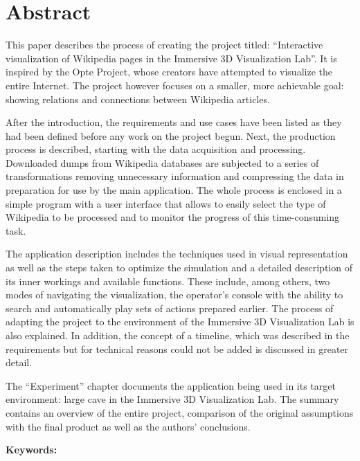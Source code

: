 \chapter*{Abstract}
This paper describes the process of creating the project titled: ``Interactive visualization of Wikipedia pages in the Immersive 3D Visualization Lab''. It is inspired by the Opte Project, whose creators have attempted to visualize the entire Internet. The project however focuses on a smaller, more achievable goal: showing relations and connections between Wikipedia articles.

After the introduction, the requirements and use cases have been listed as they had been defined before any work on the project begun. Next, the production process is described, starting with the data acquisition and processing. Downloaded dumps from Wikipedia databases are subjected to a series of transformations removing unnecessary information and compressing the data in preparation for use by the main application. The whole process is enclosed in a simple program with a user interface that allows to easily select the type of Wikipedia to be processed and to monitor the progress of this time-consuming task.

The application description includes the techniques used in visual representation as well as the steps taken to optimize the simulation and a detailed description of its inner workings and available functions. These include, among others, two modes of navigating the visualization, the operator's console with the ability to search and automatically play sets of actions prepared earlier. The process of adapting the project to the environment of the Immersive 3D Visualization Lab is also explained. In addition, the concept of a timeline, which was described in the requirements but for technical reasons could not be added is discussed in greater detail.

The ``Experiment'' chapter documents the application being used in its target environment: large cave in the Immersive 3D Visualization Lab. The summary contains an overview of the entire project, comparison of the original assumptions with the final product as well as the authors' conclusions.

\noindent\textbf{Keywords:} 
